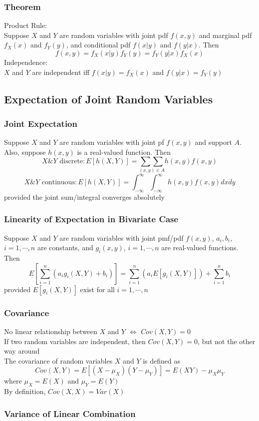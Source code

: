 \documentclass[11pt]{article}
\begin{document}
\subsubsection{Theorem}
Product Rule: \\
Suppose $X$ and $Y$ are random variables with joint pdf $f(x,y)$ and marginal pdf $f_X(x)$ and $f_Y(y)$, and conditional 
pdf $f(x|y)$ and $f(y|x)$. Then \[f(x,y)=f_X(x|y)f_Y(y)=f_Y(y|x)f_X(x)\]
Independence: \\
$X$ and $Y$ are independent iff $f(x|y)=f_X(x)$ and $f(y|x)=f_Y(y)$
\subsection{Expectation of Joint Random Variables}
\subsubsection{Joint Expectation}
Suppose $X$ and $Y$ are random variables with joint pf $f(x,y)$ and support $A$. Also, suppose $h(x,y)$ is a real-valued function. 
Then 
\[X\&Y\text{ discrete}: E[h(X,Y)]=\underset{(x,y)\in A}{\sum\sum}h(x,y)f(x,y)\]
\[X\&Y\text{ continuous}: E[h(X,Y)]=\int_{-\infty}^{\infty}\int_{-\infty}^{\infty}h(x,y)f(x,y)dxdy\]
provided the joint sum/integral converges absolutely
\subsubsection{Linearity of Expectation in Bivariate Case}
Suppose $X$ and $Y$ are random variables with joint pmf/pdf $f(x,y)$, $a_i,b_i$, $i=1,\cdots,n$ are constants, and 
$g_i(x,y)$, $i=1,\cdots,n$ are real-valued functions. Then
\[E[\sum_{i=1}^{n}(a_ig_i(X,Y)+b_i)]=\sum_{i=1}^{n}(a_iE[g_i(X,Y)])+\sum_{i=1}^{n}b_i\]
provided $E[g_i(X,Y)]$ exist for all $i=1,\cdots,n$
\subsubsection{Covariance}
No linear relationship between $X$ and $Y$ $\iff$ $Cov(X,Y)=0$ \\
If two random variables are independent, then $Cov(X,Y)=0$, but not the other way around \\
The covariance of random variables $X$ and $Y$ is defined as
\[Cov(X,Y)=E[(X-\mu_X)(Y-\mu_Y)]=E(XY)-\mu_X\mu_Y\]
where $\mu_X=E(X)$ and $\mu_Y=E(Y)$ \\
By definition, $Cov(X,X)=Var(X)$
\subsubsection{Variance of Linear Combination}
\end{document}
